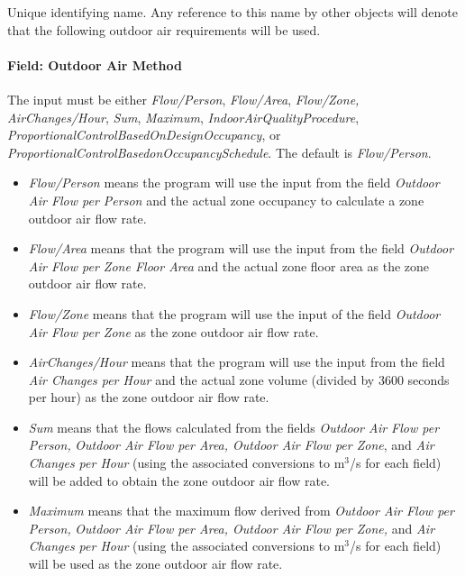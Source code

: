 Unique identifying name. Any reference to this name by other objects will denote that the following outdoor air requirements will be used.

\paragraph{Field: Outdoor Air Method}\label{field-outdoor-air-method}

The input must be either \emph{Flow/Person}, \emph{Flow/Area}, \emph{Flow/Zone, AirChanges/Hour}, \emph{Sum}, \emph{Maximum}, \emph{IndoorAirQualityProcedure}, \emph{ProportionalControlBasedOnDesignOccupancy}, or \emph{ProportionalControlBasedonOccupancySchedule}. The default is \emph{Flow/Person}.
\begin{itemize} 
\tightlist 

\item  \emph{Flow/Person} means the program will use the input from the field \emph{Outdoor Air Flow per Person} and the actual zone occupancy to calculate a zone outdoor air flow rate.  

\item  \emph{Flow/Area} means that the program will use the input from the field \emph{Outdoor Air Flow per Zone Floor Area} and the actual zone floor area as the zone outdoor air flow rate.   
\item  \emph{Flow/Zone} means that the program will use the input of the field \emph{Outdoor Air Flow per Zone} as the zone outdoor air flow rate.   

\item  \emph{AirChanges/Hour} means that the program will use the input from the field \emph{Air Changes per Hour} and the actual zone volume (divided by 3600 seconds per hour) as the zone outdoor air flow rate.  

\item  \emph{Sum} means that the flows calculated from the fields \emph{Outdoor Air Flow per Person,} \emph{Outdoor Air Flow per Area, Outdoor Air Flow per Zone}, and \emph{Air Changes per Hour} (using the associated conversions to m\(^{3}\)/s for each field) will be added to obtain the zone outdoor air flow rate.

\item  \emph{Maximum} means that the maximum flow derived from \emph{Outdoor Air Flow per Person,} \emph{Outdoor Air Flow per Area, Outdoor Air Flow per Zone,} and \emph{Air Changes per Hour} (using the associated conversions to m\(^{3}\)/s for each field) will be used as the zone outdoor air flow rate.
   

\end{itemize}
